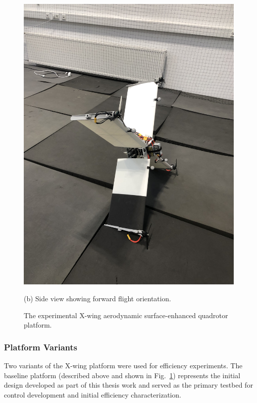 \begin{figure}[htbp]
\begin{minipage}[b]{0.48\textwidth}
    \includegraphics[width=\textwidth,angle=-90]{figures/drone_wing_flight.jpg}
    \caption*{(b) Side view showing forward flight orientation.}
\end{minipage}
\caption{The experimental X-wing aerodynamic surface-enhanced quadrotor platform.}
\label{fig:xwing_platform}
\end{figure}

\subsubsection{Platform Variants}
Two variants of the X-wing platform were used for efficiency experiments. The baseline platform (described above and shown in Fig.~\ref{fig:xwing_platform}) represents the initial design developed as part of this thesis work and served as the primary testbed for control development and initial efficiency characterization. 

